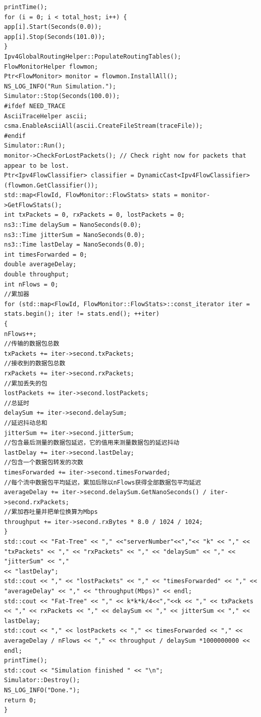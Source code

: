 \documentclass[lang=cn,11pt,a4paper,cite=authoryear]{elegantpaper}
\begin{document}
\begin{lstlisting}
printTime();
for (i = 0; i < total_host; i++) {
app[i].Start(Seconds(0.0));
app[i].Stop(Seconds(101.0));
}
Ipv4GlobalRoutingHelper::PopulateRoutingTables();
FlowMonitorHelper flowmon;
Ptr<FlowMonitor> monitor = flowmon.InstallAll();
NS_LOG_INFO("Run Simulation.");
Simulator::Stop(Seconds(100.0));
#ifdef NEED_TRACE
AsciiTraceHelper ascii;
csma.EnableAsciiAll(ascii.CreateFileStream(traceFile));
#endif
Simulator::Run();
monitor->CheckForLostPackets(); // Check right now for packets that appear to be lost.
Ptr<Ipv4FlowClassifier> classifier = DynamicCast<Ipv4FlowClassifier>(flowmon.GetClassifier());
std::map<FlowId, FlowMonitor::FlowStats> stats = monitor->GetFlowStats();
int txPackets = 0, rxPackets = 0, lostPackets = 0;
ns3::Time delaySum = NanoSeconds(0.0);
ns3::Time jitterSum = NanoSeconds(0.0);
ns3::Time lastDelay = NanoSeconds(0.0);
int timesForwarded = 0;
double averageDelay;
double throughput;
int nFlows = 0;
//累加器
for (std::map<FlowId, FlowMonitor::FlowStats>::const_iterator iter = stats.begin(); iter != stats.end(); ++iter)
{
nFlows++;
//传输的数据包总数
txPackets += iter->second.txPackets;
//接收到的数据包总数
rxPackets += iter->second.rxPackets;
//累加丢失的包
lostPackets += iter->second.lostPackets;
//总延时
delaySum += iter->second.delaySum;
//延迟抖动总和
jitterSum += iter->second.jitterSum;
//包含最后测量的数据包延迟，它的值用来测量数据包的延迟抖动
lastDelay += iter->second.lastDelay;
//包含一个数据包转发的次数
timesForwarded += iter->second.timesForwarded;
//每个流中数据包平均延迟，累加后除以nFlows获得全部数据包平均延迟
averageDelay += iter->second.delaySum.GetNanoSeconds() / iter->second.rxPackets;
//累加吞吐量并把单位换算为Mbps
throughput += iter->second.rxBytes * 8.0 / 1024 / 1024;
}
std::cout << "Fat-Tree" << "," <<"serverNumber"<<","<< "k" << "," << "txPackets" << "," << "rxPackets" << "," << "delaySum" << "," << "jitterSum" << "," 
<< "lastDelay";
std::cout << "," << "lostPackets" << "," << "timesForwarded" << "," << "averageDelay" << "," << "throughput(Mbps)" << endl;
std::cout << "Fat-Tree" << "," << k*k*k/4<<","<<k << "," << txPackets << "," << rxPackets << "," << delaySum << "," << jitterSum << "," << lastDelay;
std::cout << "," << lostPackets << "," << timesForwarded << "," << averageDelay / nFlows << "," << throughput / delaySum *1000000000 << endl;
printTime();
std::cout << "Simulation finished " << "\n";
Simulator::Destroy();
NS_LOG_INFO("Done.");
return 0;
}

\end{lstlisting}
\end{document}
